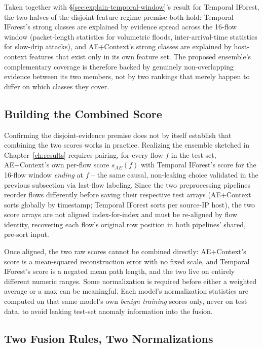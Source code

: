 Taken together with \S\ref{sec:explain-temporal-window}'s result for Temporal IForest, the two halves of the disjoint-feature-regime premise both hold: Temporal IForest's strong classes are explained by evidence spread across the 16-flow window (packet-length statistics for volumetric floods, inter-arrival-time statistics for slow-drip attacks), and AE+Context's strong classes are explained by host-context features that exist only in its own feature set. The proposed ensemble's complementary coverage is therefore backed by genuinely non-overlapping evidence between its two members, not by two rankings that merely happen to differ on which classes they cover.

\subsection{Building the Combined Score}
\label{sec:explain-ensemble-build}

Confirming the disjoint-evidence premise does not by itself establish that combining the two scores works in practice. Realizing the ensemble sketched in Chapter~\ref{ch:results} requires pairing, for every flow $f$ in the test set, AE+Context's own per-flow score $s_{AE}(f)$ with Temporal IForest's score for the 16-flow window \emph{ending} at $f$ -- the same causal, non-leaking choice validated in the previous subsection via last-flow labeling. Since the two preprocessing pipelines reorder flows differently before saving their respective test arrays (AE+Context sorts globally by timestamp; Temporal IForest sorts per source-IP host), the two score arrays are not aligned index-for-index and must be re-aligned by flow identity, recovering each flow's original row position in both pipelines' shared, pre-sort input.

Once aligned, the two raw scores cannot be combined directly: AE+Context's score is a mean-squared reconstruction error with no fixed scale, and Temporal IForest's score is a negated mean path length, and the two live on entirely different numeric ranges. Some normalization is required before either a weighted average or a max can be meaningful. Each model's normalization statistics are computed on that same model's own \emph{benign training} scores only, never on test data, to avoid leaking test-set anomaly information into the fusion.

\subsection{Two Fusion Rules, Two Normalizations}
\label{sec:explain-ensemble-fusion}

